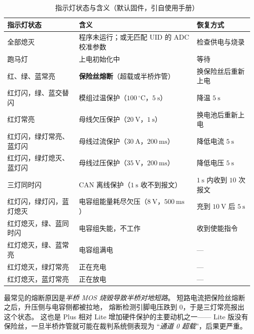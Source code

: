 \documentclass[cn,blue,11pt,device=normal]{elegantnote}
\begin{document}
\begin{table}[htbp]
  \centering
  \small
  \caption{指示灯状态与含义（默认固件，引自使用手册）}
  \label{tab:led}
  \begin{tabular}{@{}>{\raggedright\arraybackslash}p{}>{\raggedright\arraybackslash}p{}>{\raggedright\arraybackslash}p{}@{}}
    \toprule
    指示灯状态 & 含义 & 恢复方式 \\
    \midrule
    全部熄灭 & 程序未运行；或无匹配 UID 的 ADC 校准参数 & 检查供电与烧录 \\
    跑马灯 & 上电初始化中 & 等待 \\
    红、绿、蓝常亮 & \textbf{保险丝熔断}（超载或半桥炸管） & 换保险丝后重新上电 \\
    红灯闪，绿、蓝交替闪 & 模组过温保护（$100\,^{\circ}\mathrm{C}$，$5\ \mathrm{s}$） & 降温 $5\ \mathrm{s}$ \\
    红灯常亮 & 母线欠压保护（$20\ \mathrm{V}$，$1\ \mathrm{s}$） & 换电池后重新上电 \\
    红灯闪，绿灯常亮、蓝灯闪 & 母线过流保护（$30\ \mathrm{A}$，$200\ \mathrm{ms}$） & 降低电流 $5\ \mathrm{s}$ \\
    红灯闪，绿灯熄灭、蓝灯闪 & 母线过压保护（$35\ \mathrm{V}$，$200\ \mathrm{ms}$） & 降低电压 $5\ \mathrm{s}$ \\
    三灯同时闪 & CAN 离线保护（$1\ \mathrm{s}$ 收不到报文） & $1\ \mathrm{s}$ 内收到 $10$ 次报文 \\
    红灯闪，绿灯闪，蓝灯熄灭 & 电容组能量耗尽欠压（$8\ \mathrm{V}$，$500\ \mathrm{ms}$） & 充到 $10\ \mathrm{V}$ 后 $5\ \mathrm{s}$ \\
    红灯熄灭，绿、蓝同时闪 & 电容组失能，不工作 & 收到使能指令 \\
    红灯熄灭，绿、蓝常亮 & 电容组满电 & — \\
    红灯熄灭，绿灯常亮 & 正在充电 & — \\
    红灯熄灭，蓝灯常亮 & 正在放电 & — \\
    \bottomrule
  \end{tabular}
\end{table}

\begin{note}
最常见的熔断原因是\emph{半桥 MOS 烧毁导致半桥对地短路}。
短路电流把保险丝熔断之后，升压侧与电容侧都被拉地，
熔断检测引脚电压跌到 $0$，于是三灯常亮报出这个状态。
这也是 Plus 相对 Lite 增加硬件保护的主要动机之一——
Lite 版没有保险丝，一旦半桥炸管就可能在裁判系统侧表现为
“\emph{通道 0 超载}”，后果更严重。
\end{note}
\end{document}

